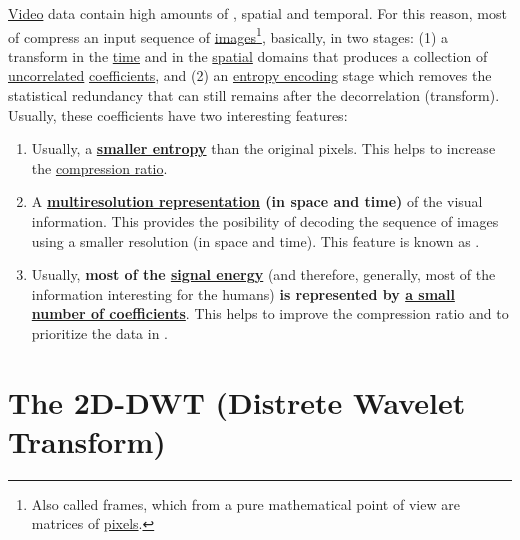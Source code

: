 \href{https://en.wikipedia.org/wiki/Video}{Video} data contain high
amounts of , spatial and temporal. For
this reason, most of 
compress an input sequence of
\href{https://en.wikipedia.org/wiki/Digital_image}{images}\footnote{Also
  called frames, which from a pure mathematical point of view are
  matrices of \href{https://en.wikipedia.org/wiki/Pixel}{pixels}.},
basically, in two stages: (1) a transform in the
\href{https://en.wikipedia.org/wiki/Time_domain}{time} and in the
\href{https://www.quora.com/What-is-spatial-domain-in-image-processing}{spatial}
domains that produces a collection of
\href{https://en.wikipedia.org/wiki/Decorrelation}{uncorrelated}
\href{https://en.wikipedia.org/wiki/Discrete_wavelet_transform}{coefficients},
and (2) an
\href{https://en.wikipedia.org/wiki/Entropy_encoding}{entropy
  encoding} stage which removes the statistical redundancy that can
still remains after the decorrelation (transform). Usually, these
coefficients have two interesting features:
\begin{enumerate}
\item Usually, a \textbf{
  \href{https://vicente-gonzalez-ruiz.github.io/symbol_compression/}{smaller
  entropy}} than the original pixels. This helps to increase
  the \href{https://en.wikipedia.org/wiki/Data_compression_ratio}{compression
    ratio}.
\item A
  \textbf{\href{https://en.wikipedia.org/wiki/Image_resolution}{multiresolution
      representation} (in space and time)} of the visual
  information. This provides the posibility of decoding the sequence
  of images using a smaller resolution (in space and time). This
  feature is known as .
\item Usually, \textbf{most of the
  \href{https://en.wikipedia.org/wiki/Energy_(signal_processing)}{signal
    energy}} (and therefore, generally, most of the information
  interesting for the humans) \textbf{is represented by
    \href{https://vicente-gonzalez-ruiz.github.io/image_transformations_for_coding}{a
      small number of coefficients}}. This helps to improve the
  compression ratio and to prioritize the data in
  .
\end{enumerate}


\section{The 2D-DWT (Distrete Wavelet Transform)}


